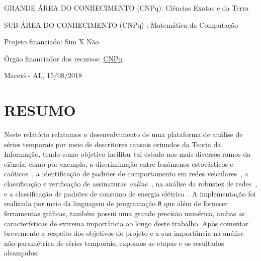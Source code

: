 \documentclass[12pt,letterpaper]{article}
\begin{document}
GRANDE ÁREA DO CONHECIMENTO (CNPq): Ciências  Exatas  e  da  Terra

SUB-ÁREA DO CONHECIMENTO (CNPq) : Matemática  da  Computação   

\vspace{0.5cm}

Projeto financiado:  \hspace*{1.5cm} Sim X \hspace*{1.5cm} Não

Órgão financiador dos recursos: \underline{CNPq}

\vspace*{0.8cm}

\begin{center}

Maceió - AL, 15/08/2018

\end{center}


\newpage
\section*{\centering \textbf{RESUMO}} %

	Neste relatório relatamos o desenvolvimento de uma plataforma de análise de séries temporais por meio de descritores causais oriundos da Teoria da Informação, tendo como objetivo facilitar tal estudo nos mais diversos ramos da ciência, como por exemplo, a discriminação entre fenómenos estocásticos e caóticos~\cite{DistinguishingNoiseFromChaos}, a identificação de padrões de comportamento em redes veiculares~\cite{CharacterizationVehicleBehaviorInformationTheory}, a classificação e verificação de assinaturas \textit{online}~\cite{ClassificationVerificationOnlineHandwrittenSignatures}, na análise da robustez de redes~\cite{InformationTheoryPerspectiveNetworkRobustness}, e a classificação de padrões de consumo de energia elétrica~\cite{CharacterizationElectricLoadInformationTheoryQuantifiers}.
    A implementação foi realizada por meio da linguagem de programação \texttt R que além de fornecer ferramentas gráficas, também possui uma grande precisão numérica, ambas as características de extrema importância ao longo deste trabalho.
 Após comentar brevemente a respeito dos objetivos do projeto e a sua importância na análise não-paramétrica de séries temporais, expomos as etapas e os resultados alcançados.\\
\end{document}
